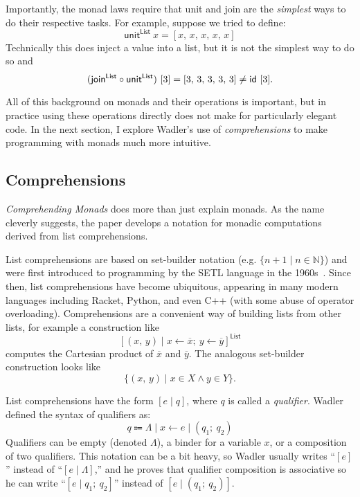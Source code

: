 \documentclass[acmsmall, nonacm, screen]{acmart}
\newcommand{\unit}[2]{\textsf{unit}^{\textsf{#1}}~#2}
\begin{document}
Importantly, the monad laws require that \textsf{unit} and \textsf{join} are the {\em simplest}
ways to do their respective tasks. For example, suppose we tried to define:
\[ \unit{List}{x} = [x,\, x,\, x,\, x,\, x] \]
Technically this does inject a value into a list, but it is not the simplest way to do so and
\[
  (\textsf{join}^{\textsf{List}} \circ \textsf{unit}^{\textsf{List}})~[3] = [3,\, 3,\, 3,\, 3,\, 3] \neq \textsf{id}~[3]. \\
\]

All of this background on monads and their operations is important, but in practice using these
operations directly does not make for particularly elegant code. In the next section, I explore
Wadler's use of {\em comprehensions} to make programming with monads much more intuitive.

\subsection{Comprehensions}
{\em Comprehending Monads} does more than just explain monads. As the name cleverly suggests, the
paper develops a notation for monadic computations derived from list comprehensions.

List comprehensions are based on set-builder notation (e.g. $\{n + 1 \mid n \in \mathbb{N}\}$)
and were first introduced to programming by the SETL language in the
1960s~\cite{schwartz2012programming}. Since then, list comprehensions have become ubiquitous,
appearing in many modern languages including Racket, Python, and even C++ (with some abuse of
operator overloading). Comprehensions are a convenient way of building lists from other lists,
for example a construction like
\[ [(x,\, y) \mid x \leftarrow \overline{x};\ y \leftarrow \overline{y}]^{\textsf{List}} \]
computes the Cartesian product of $\overline{x}$ and $\overline{y}$. The analogous set-builder
construction looks like
\[ \{(x,\, y) \mid x \in X \wedge y \in Y\}. \]

List comprehensions have the form $[e \mid q]$, where $q$ is called a {\em qualifier}. Wadler
defined the syntax of qualifiers as:
\[ q \Coloneqq \Lambda \mid x \leftarrow e \mid (q_1;\ q_2) \]
Qualifiers can be empty (denoted $\Lambda$), a binder for a variable $x$, or a composition of two
qualifiers. This notation can be a bit heavy, so Wadler usually writes ``$[e]$'' instead of ``$[e
\mid \Lambda]$,'' and he proves that qualifier composition is associative so he can write ``$[e
\mid q_1;\ q_2]$'' instead of $[e \mid (q_1;\ q_2)]$.
\end{document}
